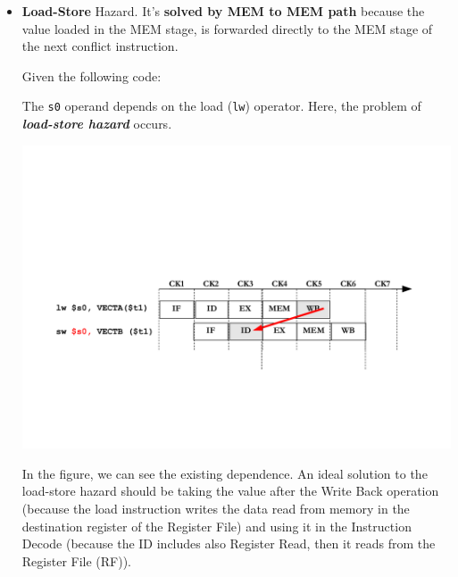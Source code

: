 \documentclass[a4paper]{article}
\begin{document}
\begin{itemize}
        \item \textbf{Load-Store} Hazard. It's \textbf{solved by MEM to MEM path} because the value loaded in the MEM stage, is forwarded directly to the MEM stage of the next conflict instruction.
        \begin{examplebox}
            Given the following code:
            
            The \texttt{s0} operand depends on the load (\texttt{lw}) operator. Here, the problem of \textbf{\emph{load-store hazard}} occurs.
            \begin{center}
                \includegraphics[width=\textwidth]{img/load-store-hazard-problem-1.pdf}
            \end{center}
            In the figure, we can see the existing dependence. An ideal solution to the load-store hazard should be taking the value after the Write Back operation (because the load instruction writes the data read from memory in the destination register of the Register File) and using it in the Instruction Decode (because the ID includes also Register Read, then it reads from the Register File (RF)).


\end{examplebox}
\end{itemize}
\end{document}
